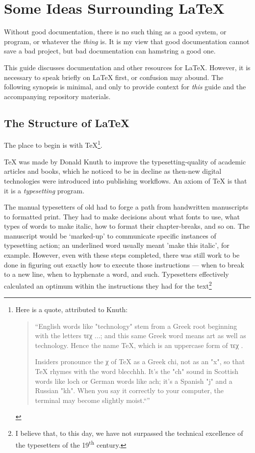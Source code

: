 \documentclass[11pt, oneside]{memoir}
\begin{document}
\chapter{Some Ideas Surrounding \LaTeX{}}
Without good documentation, there is no such thing as a good system, or program, or whatever the \emph{thing} is. It is my view that good documentation cannot save a bad project, but bad documentation can hamstring a good one.

This guide discusses documentation and other resources for LaTeX. However, it is necessary to speak briefly on LaTeX first, or confusion may abound. The following synopsis is minimal, and only to provide context for \emph{this} guide and the accompanying repository materials.

\newpage
\section{The Structure of \LaTeX{}}

The place to begin is with \TeX{}\footnote{Here is a quote, attributed to Knuth: \begin{quotation}``English words like "technology" stem from a Greek root beginning with the letters \ebg τεχ \nf ...; and this same Greek word means art as well as technology. Hence the name TeX, which is an uppercase form of \ebg τεχ \nf.

Insiders pronounce the χ of TeX as a Greek chi, not as an "x", so that TeX rhymes with the word blecchhh. It’s the "ch" sound in Scottish words like loch or German words like ach; it’s a Spanish "j" and a Russian "kh". When you say it correctly to your computer, the terminal may become slightly moist.``''\end{quotation}}.

TeX was made by Donald Knuth to improve the typesetting-quality of academic articles and books, which he noticed to be in decline as then-new digital technologies were introduced into publishing workflows. An axiom of \TeX{} is that it is a \emph{typesetting} program.

The manual typesetters of old had to forge a path from handwritten manuscripts to formatted print. They had to make decisions about what fonts to use, what types of words to make italic, how to format their chapter-breaks, and so on. The manuscript would be `marked-up' to communicate specific instances of typesetting action; an underlined word usually meant 'make this italic', for example. However, even with these steps completed, there was still work to be done in figuring out exactly how to execute those instructions — when to break to a new line, when to hyphenate a word, and such. Typesetters effectively calculated an optimum within the instructions they had for the text\footnote{I believe that, to this day, we have not surpassed the technical excellence of the typesetters of the 19\textsuperscript{th} century.}
\end{document}
